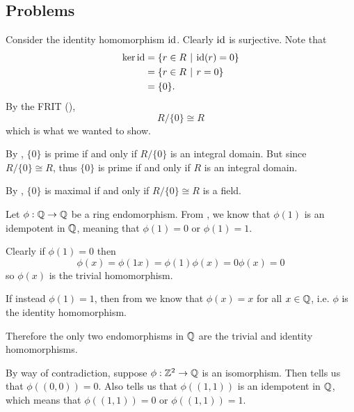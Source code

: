 \subsection*{Problems}
\begin{questions}
    \item \begin{partquestions}{\roman*}
        \item Consider the identity homomorphism $\mathrm{id}$. Clearly $\mathrm{id}$ is surjective. Note that
        \begin{align*}
            \ker\id &= \{r \in R \vert \id(r) = 0\}\\
            &= \{r \in R \vert r = 0\}\\
            &= \{0\}.
        \end{align*}
        By the FRIT (),
        \[
            R / \{0\} \cong R
        \]
        which is what we wanted to show.

        \item By , $\{0\}$ is prime if and only if $R/\{0\}$ is an integral domain. But since $R/\{0\} \cong R$, thus $\{0\}$ is prime if and only if $R$ is an integral domain.

        \item By , $\{0\}$ is maximal if and only if $R/\{0\} \cong R$ is a field.
    \end{partquestions}

    \item Let $\phi: \mathbb{Q} \to \mathbb{Q}$ be a ring endomorphism. From , we know that $\phi(1)$ is an idempotent in $\mathbb{Q}$, meaning that $\phi(1) = 0$ or $\phi(1) = 1$.

    Clearly if $\phi(1) = 0$ then
    \[
        \phi(x) = \phi(1x) = \phi(1)\phi(x) = 0\phi(x) = 0
    \]
    so $\phi(x)$ is the trivial homomorphism.

    If instead $\phi(1) = 1$, then from  we know that $\phi(x) = x$ for all $x \in \mathbb{Q}$, i.e. $\phi$ is the identity homomorphism.

    Therefore the only two endomorphisms in $\mathbb{Q}$ are the trivial and identity homomorphisms.

    \item By way of contradiction, suppose $\phi: \mathbb{Z}^2 \to \mathbb{Q}$ is an isomorphism. Then  tells us that $\phi((0,0)) = 0$. Also  tells us that $\phi((1,1))$ is an idempotent in $\mathbb{Q}$, which means that $\phi((1,1)) = 0$ or $\phi((1,1)) = 1$.


\end{questions}

